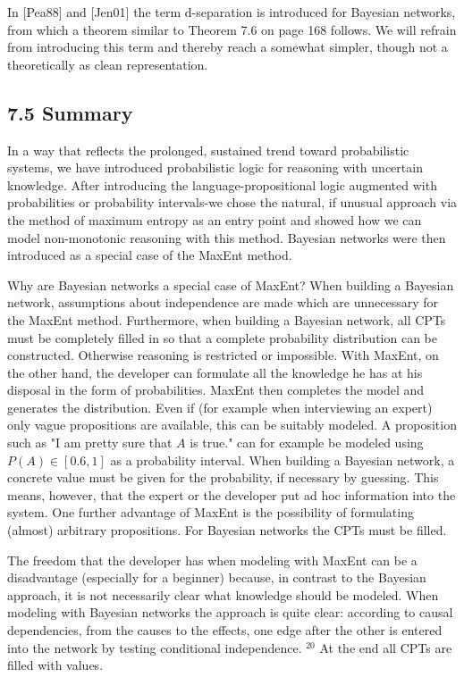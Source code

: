 \documentclass[10pt]{article}
\begin{document}
In [Pea88] and [Jen01] the term d-separation is introduced for Bayesian networks, from which a theorem similar to Theorem 7.6 on page 168 follows. We will refrain from introducing this term and thereby reach a somewhat simpler, though not a theoretically as clean representation.

\subsection*{7.5 Summary}
In a way that reflects the prolonged, sustained trend toward probabilistic systems, we have introduced probabilistic logic for reasoning with uncertain knowledge. After introducing the language-propositional logic augmented with probabilities or probability intervals-we chose the natural, if unusual approach via the method of maximum entropy as an entry point and showed how we can model non-monotonic reasoning with this method. Bayesian networks were then introduced as a special case of the MaxEnt method.

Why are Bayesian networks a special case of MaxEnt? When building a Bayesian network, assumptions about independence are made which are unnecessary for the MaxEnt method. Furthermore, when building a Bayesian network, all CPTs must be completely filled in so that a complete probability distribution can be constructed. Otherwise reasoning is restricted or impossible. With MaxEnt, on the other hand, the developer can formulate all the knowledge he has at his disposal in the form of probabilities. MaxEnt then completes the model and generates the distribution. Even if (for example when interviewing an expert) only vague propositions are available, this can be suitably modeled. A proposition such as "I am pretty sure that $A$ is true." can for example be modeled using $P(A) \in[0.6,1]$ as a probability interval. When building a Bayesian network, a concrete value must be given for the probability, if necessary by guessing. This means, however, that the expert or the developer put ad hoc information into the system. One further advantage of MaxEnt is the possibility of formulating (almost) arbitrary propositions. For Bayesian networks the CPTs must be filled.

The freedom that the developer has when modeling with MaxEnt can be a disadvantage (especially for a beginner) because, in contrast to the Bayesian approach, it is not necessarily clear what knowledge should be modeled. When modeling with Bayesian networks the approach is quite clear: according to causal dependencies, from the causes to the effects, one edge after the other is entered into the network by testing conditional independence. ${ }^{20}$ At the end all CPTs are filled with values.
\end{document}
